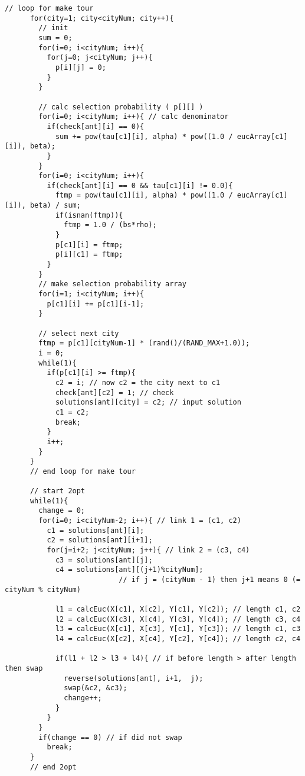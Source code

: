 \documentclass[a4j]{jsarticle}
\begin{document}
\begin{lstlisting}[caption=MMAS2opt.c, label=MMAS2opt, xleftmargin=1cm]
      // loop for make tour
      for(city=1; city<cityNum; city++){
        // init
        sum = 0;
        for(i=0; i<cityNum; i++){
          for(j=0; j<cityNum; j++){
            p[i][j] = 0;
          }
        }

        // calc selection probability ( p[][] )
        for(i=0; i<cityNum; i++){ // calc denominator
          if(check[ant][i] == 0){
            sum += pow(tau[c1][i], alpha) * pow((1.0 / eucArray[c1][i]), beta);
          }
        }
        for(i=0; i<cityNum; i++){
          if(check[ant][i] == 0 && tau[c1][i] != 0.0){
            ftmp = pow(tau[c1][i], alpha) * pow((1.0 / eucArray[c1][i]), beta) / sum;
            if(isnan(ftmp)){
              ftmp = 1.0 / (bs*rho);
            }
            p[c1][i] = ftmp;
            p[i][c1] = ftmp;
          }
        }
        // make selection probability array
        for(i=1; i<cityNum; i++){
          p[c1][i] += p[c1][i-1];
        }

        // select next city
        ftmp = p[c1][cityNum-1] * (rand()/(RAND_MAX+1.0));
        i = 0;
        while(1){
          if(p[c1][i] >= ftmp){
            c2 = i; // now c2 = the city next to c1
            check[ant][c2] = 1; // check
            solutions[ant][city] = c2; // input solution
            c1 = c2;
            break;
          }
          i++;
        }
      }
      // end loop for make tour
      
      // start 2opt
      while(1){
        change = 0;
        for(i=0; i<cityNum-2; i++){ // link 1 = (c1, c2)
          c1 = solutions[ant][i];
          c2 = solutions[ant][i+1];
          for(j=i+2; j<cityNum; j++){ // link 2 = (c3, c4)
            c3 = solutions[ant][j];
            c4 = solutions[ant][(j+1)%cityNum]; 
                           // if j = (cityNum - 1) then j+1 means 0 (= cityNum % cityNum)
            
            l1 = calcEuc(X[c1], X[c2], Y[c1], Y[c2]); // length c1, c2
            l2 = calcEuc(X[c3], X[c4], Y[c3], Y[c4]); // length c3, c4
            l3 = calcEuc(X[c1], X[c3], Y[c1], Y[c3]); // length c1, c3
            l4 = calcEuc(X[c2], X[c4], Y[c2], Y[c4]); // length c2, c4
            
            if(l1 + l2 > l3 + l4){ // if before length > after length then swap
              reverse(solutions[ant], i+1,  j);
              swap(&c2, &c3);
              change++;
            }
          }
        }
        if(change == 0) // if did not swap
          break;
      }
      // end 2opt
      

\end{lstlisting}
\end{document}

